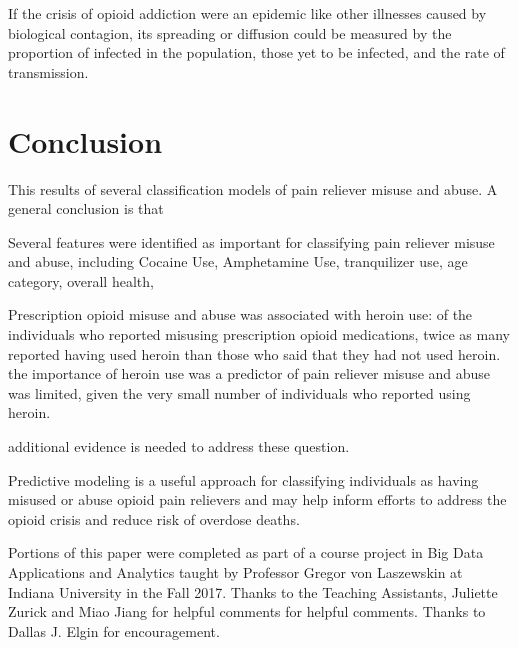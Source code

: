 \documentclass[sigconf]{acmart}
\begin{document}
If the crisis of opioid addiction were an epidemic like other illnesses caused 
by biological contagion, its spreading or diffusion could be measured by the 
proportion of infected in the population, those yet to be infected, and the 
rate of transmission. 

\section{Conclusion}

This results of several classification models of 
pain reliever misuse and abuse. A general conclusion is that 

Several features were identified as important for classifying pain reliever
misuse and abuse, including Cocaine Use, Amphetamine Use, tranquilizer use,
age category, overall health,

Prescription opioid misuse and abuse was associated with heroin use: of 
the individuals who reported misusing prescription opioid medications, twice 
as many reported having used heroin than those who said that they had not used 
heroin. the importance of heroin use was a predictor of pain reliever misuse and
abuse was limited, given the very small number of individuals who reported 
using heroin.

additional evidence is needed to address these question. 

Predictive modeling is a useful approach for classifying individuals as 
having misused or abuse opioid pain relievers and may help inform 
efforts to address the opioid crisis and reduce risk of overdose deaths. 


\begin{acks}

Portions of this paper were completed as part of a course project in Big Data 
Applications and Analytics taught by Professor Gregor von Laszewskin at 
Indiana University in the Fall 2017. Thanks to the Teaching Assistants, 
Juliette Zurick and Miao Jiang for helpful comments for helpful comments. 
Thanks to Dallas J. Elgin for encouragement. 

\end{acks}

 

%
\end{document}
